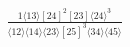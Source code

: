 \documentclass[varwidth, border=5pt]{standalone}
\begin{document}
\begin{my}
$\begin{gathered}
\scriptscriptstyle\frac{1⟨13⟩[24]^2[23]⟨24⟩^3}{⟨12⟩⟨14⟩⟨23⟩[25]^3⟨34⟩⟨45⟩}
\end{gathered}$
\end{my}
\end{document}
